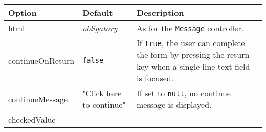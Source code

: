 \documentclass[
]{article}
\begin{document}
\begin{RaggedRight}\small\begin{longtable}[]{p{1.7in}p{1in}p{3.15in}}
\toprule
\begin{minipage}[b]{0.26\columnwidth}\raggedright
\textbf{Option}\strut
\end{minipage} & \begin{minipage}[b]{0.28\columnwidth}\raggedright
\textbf{Default}\strut
\end{minipage} & \begin{minipage}[b]{0.37\columnwidth}\raggedright
\textbf{Description}\strut
\end{minipage}\tabularnewline
\midrule
\endhead
\begin{minipage}[t]{0.26\columnwidth}\raggedright
html\strut
\end{minipage} & \begin{minipage}[t]{0.28\columnwidth}\raggedright
\emph{obligatory}\strut
\end{minipage} & \begin{minipage}[t]{0.37\columnwidth}\raggedright
As for the \texttt{Message} controller.\strut
\end{minipage}\tabularnewline
\begin{minipage}[t]{0.26\columnwidth}\raggedright
continueOnReturn\strut
\end{minipage} & \begin{minipage}[t]{0.28\columnwidth}\raggedright
\texttt{false}\strut
\end{minipage} & \begin{minipage}[t]{0.37\columnwidth}\raggedright
If \texttt{true}, the user can complete the form by pressing the return
key when a single-line text field is focused.\strut
\end{minipage}\tabularnewline
\begin{minipage}[t]{0.26\columnwidth}\raggedright
continueMessage\strut
\end{minipage} & \begin{minipage}[t]{0.28\columnwidth}\raggedright
"Click here to continue"\strut
\end{minipage} & \begin{minipage}[t]{0.37\columnwidth}\raggedright
If set to \texttt{null}, no continue message is displayed.\strut
\end{minipage}\tabularnewline
\begin{minipage}[t]{0.26\columnwidth}\raggedright
checkedValue\strut
\end{minipage} & \begin{minipage}[t]{0.28\columnwidth}\raggedright

\end{minipage}
\end{longtable}
\end{RaggedRight}
\end{document}
